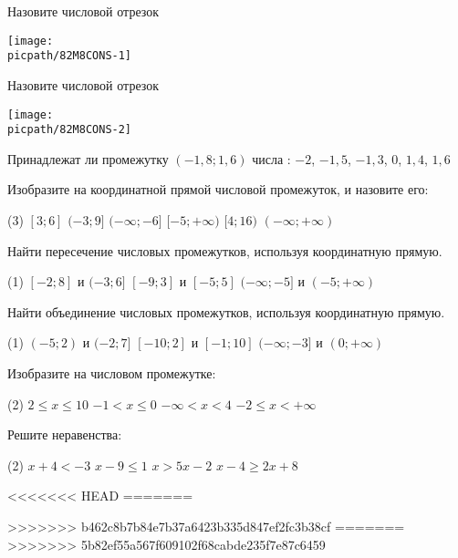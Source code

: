 \begin{consultation}[number=1]
	\begin{listofex}
		\item 
		\begin{minipage}[t]{\bodywidth}
			Назовите числовой отрезок
		\end{minipage}
		\hspace{0.02\linewidth}
		\begin{minipage}[t]{\picwidth}
			\texttt{[image: \\picpath/82M8CONS-1]}
		\end{minipage}
		\item 
		\begin{minipage}[t]{\bodywidth}
			Назовите числовой отрезок
		\end{minipage}
		\hspace{0.02\linewidth}
		\begin{minipage}[t]{\picwidth}
			\texttt{[image: \\picpath/82M8CONS-2]}
		\end{minipage}
		\item Принадлежат ли промежутку \( (-1,8;1,6) \) числа : \( -2 \), \( -1,5 \), \( -1,3 \), \( 0 \), \( 1,4 \), \( 1,6 \)
		\item Изобразите на координатной прямой числовой промежуток, и назовите его:
		\begin{tasks}(3)
			\task \( [3;6] \)
			\task \( (-3;9] \)
			\task \( (-\infty;-6] \)
			\task \( [-5;+\infty) \)
			\task \( [4;16) \)
			\task \( (-\infty;+\infty )\)
		\end{tasks}
		\item Найти пересечение числовых промежутков, используя координатную прямую.
		\begin{tasks}(1)
			\task \( [-2;8] \) и \( (-3;6] \)
			\task \( [-9;3] \) и \( [-5;5] \)
			\task \( (-\infty;-5] \) и \( (-5;+\infty) \)
		\end{tasks}
		\item Найти объединение числовых промежутков, используя координатную прямую.
		\begin{tasks}(1)
			\task \( (-5;2) \) и \( (-2;7] \)
			\task \( [-10;2] \) и \( [-1;10] \)
			\task \( (-\infty;-3] \) и \( (0;+\infty) \)
		\end{tasks}
		\item Изобразите на числовом промежутке:
		\begin{tasks}(2)
			\task \( 2\leq x\leq 10\)
			\task \( -1< x\leq 0\)
			\task \( -\infty < x< 4\)
			\task \( -2\leq x<+\infty \)
		\end{tasks}
		\item Решите неравенства:
		\begin{tasks}(2)
			\task \( x+4<-3 \)
			\task \( x-9\leq 1 \)
			\task \( x>5x-2\)
			\task \( x-4\geq 2x+8\)
		\end{tasks}
	\end{listofex}
\end{consultation}
<<<<<<< HEAD
=======
	\begin{consultation}
		\begin{listofex}
			\item 
		\end{listofex}
	\end{consultation}
>>>>>>> b462c8b7b84e7b37a6423b335d847ef2fc3b38cf
=======
>>>>>>> 5b82ef55a567f609102f68cabde235f7e87c6459
